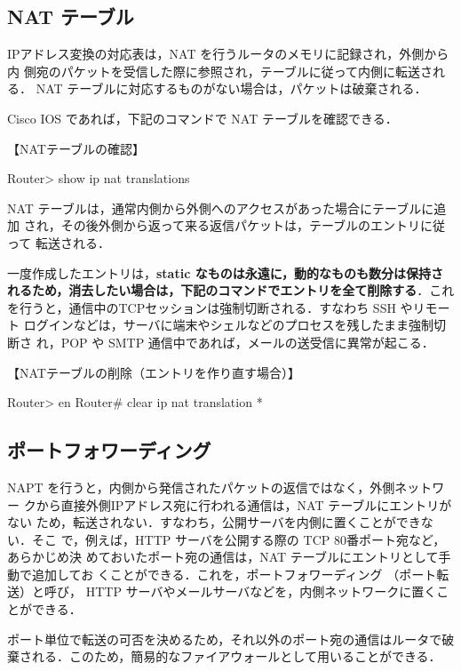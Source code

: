 \subsection*{NAT テーブル}

IPアドレス変換の対応表は，NAT を行うルータのメモリに記録され，外側から内
側宛のパケットを受信した際に参照され，テーブルに従って内側に転送される．
NAT テーブルに対応するものがない場合は，パケットは破棄される．

Cisco IOS であれば，下記のコマンドで NAT テーブルを確認できる．

\begin{cli}
【NATテーブルの確認】

Router> show ip nat translations 
\end{cli}

NAT テーブルは，通常内側から外側へのアクセスがあった場合にテーブルに追加
され，その後外側から返って来る返信パケットは，テーブルのエントリに従って
転送される．

一度作成したエントリは，\textbf{static なものは永遠に，動的なものも数分は保持さ
れるため，消去したい場合は，下記のコマンドでエントリを全て削除する}．これ
を行うと，通信中のTCPセッションは強制切断される．すなわち SSH やリモート
ログインなどは，サーバに端末やシェルなどのプロセスを残したまま強制切断さ
れ，POP や SMTP 通信中であれば，メールの送受信に異常が起こる．

\begin{cli}
【NATテーブルの削除（エントリを作り直す場合）】

Router> en
Router# clear ip nat translation *
\end{cli}

\subsection{ポートフォワーディング}

NAPT を行うと，内側から発信されたパケットの返信ではなく，外側ネットワー
クから直接外側IPアドレス宛に行われる通信は，NAT テーブルにエントリがない
ため，転送されない．すなわち，公開サーバを内側に置くことができない．そこ
で，例えば，HTTP サーバを公開する際の TCP 80番ポート宛など，あらかじめ決
めておいたポート宛の通信は，NAT テーブルにエントリとして手動で追加してお
くことができる．これを，ポートフォワーディング （ポート転送）と呼び，
HTTP サーバやメールサーバなどを，内側ネットワークに置くことができる．

ポート単位で転送の可否を決めるため，それ以外のポート宛の通信はルータで破
棄される．このため，簡易的なファイアウォールとして用いることができる．

